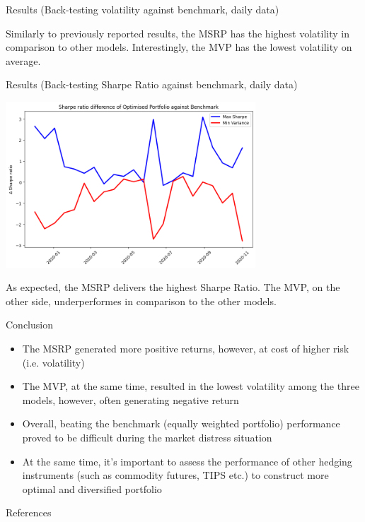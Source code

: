 \documentclass{beamer}
\begin{document}
\begin{frame}{Results (Back-testing volatility against benchmark, daily data)}
    \begin{center}
    \end{center}    
\small{Similarly to previously reported results, the MSRP has the highest volatility in comparison to other models. Interestingly, the MVP has the lowest volatility on average.}
\end{frame}

\begin{frame}{Results (Back-testing Sharpe Ratio against benchmark, daily data)}
    \begin{center}
        \includegraphics[width=0.7\textwidth]{resources/Sharpe ratio difference of Optimised Portfolio against Benchmark.png}
    \end{center}
\small{As expected, the MSRP delivers the highest Sharpe Ratio. The MVP, on the other side, underperformes in comparison to the other models.}
\end{frame}

\begin{frame}{Conclusion}
    \begin{itemize}
        \item The MSRP generated more positive returns, however, at cost of higher risk (i.e. volatility)
        \item  The MVP, at the same time, resulted in the lowest volatility among the three models, however, often generating negative return
        \item Overall, beating the benchmark (equally weighted portfolio) performance proved to be difficult during the market distress situation
        \item At the same time, it's important to assess the performance of other hedging instruments (such as commodity futures, TIPS etc.) to construct more optimal and diversified portfolio
    \end{itemize}
\end{frame}

\begin{frame}{References}
\printbibliography
\end{frame}
\end{document}
